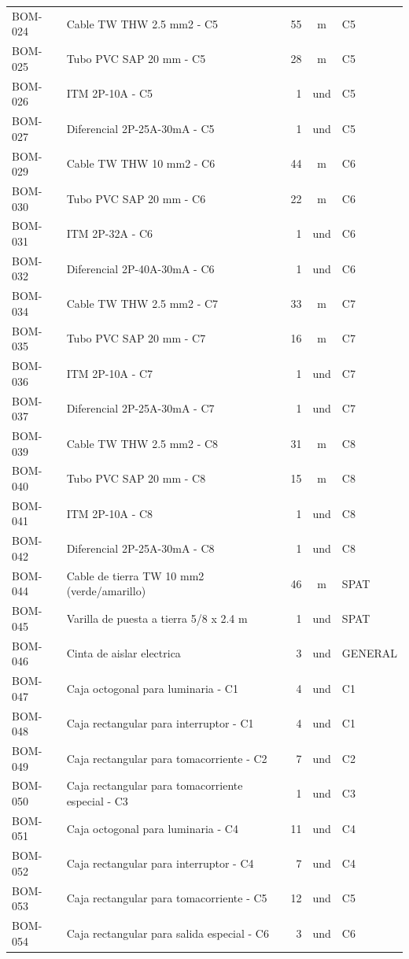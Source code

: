 \begin{longtable}{p{1.7cm}p{7.5cm}r c p{2.2cm}}
BOM-024 & Cable TW THW 2.5 mm2 - C5 & 55 & m & C5 \\
BOM-025 & Tubo PVC SAP 20 mm - C5 & 28 & m & C5 \\
BOM-026 & ITM 2P-10A - C5 & 1 & und & C5 \\
BOM-027 & Diferencial 2P-25A-30mA - C5 & 1 & und & C5 \\
BOM-029 & Cable TW THW 10 mm2 - C6 & 44 & m & C6 \\
BOM-030 & Tubo PVC SAP 20 mm - C6 & 22 & m & C6 \\
BOM-031 & ITM 2P-32A - C6 & 1 & und & C6 \\
BOM-032 & Diferencial 2P-40A-30mA - C6 & 1 & und & C6 \\
BOM-034 & Cable TW THW 2.5 mm2 - C7 & 33 & m & C7 \\
BOM-035 & Tubo PVC SAP 20 mm - C7 & 16 & m & C7 \\
BOM-036 & ITM 2P-10A - C7 & 1 & und & C7 \\
BOM-037 & Diferencial 2P-25A-30mA - C7 & 1 & und & C7 \\
BOM-039 & Cable TW THW 2.5 mm2 - C8 & 31 & m & C8 \\
BOM-040 & Tubo PVC SAP 20 mm - C8 & 15 & m & C8 \\
BOM-041 & ITM 2P-10A - C8 & 1 & und & C8 \\
BOM-042 & Diferencial 2P-25A-30mA - C8 & 1 & und & C8 \\
BOM-044 & Cable de tierra TW 10 mm2 (verde/amarillo) & 46 & m & SPAT \\
BOM-045 & Varilla de puesta a tierra 5/8 x 2.4 m & 1 & und & SPAT \\
BOM-046 & Cinta de aislar electrica & 3 & und & GENERAL \\
BOM-047 & Caja octogonal para luminaria - C1 & 4 & und & C1 \\
BOM-048 & Caja rectangular para interruptor - C1 & 4 & und & C1 \\
BOM-049 & Caja rectangular para tomacorriente - C2 & 7 & und & C2 \\
BOM-050 & Caja rectangular para tomacorriente especial - C3 & 1 & und & C3 \\
BOM-051 & Caja octogonal para luminaria - C4 & 11 & und & C4 \\
BOM-052 & Caja rectangular para interruptor - C4 & 7 & und & C4 \\
BOM-053 & Caja rectangular para tomacorriente - C5 & 12 & und & C5 \\
BOM-054 & Caja rectangular para salida especial - C6 & 3 & und & C6 \\

\end{longtable}
